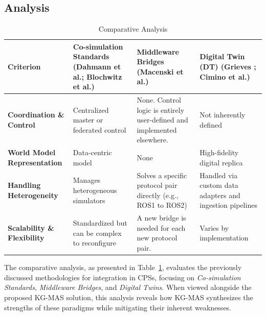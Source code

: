 \documentclass{article} %
\begin{document}
\subsection{Analysis}
\begin{table}[H]
\centering
\caption{Comparative Analysis}
\label{tab:comparison_cosim_middleware_dt}
\small
\begin{tabularx}{\textwidth}{@{} l >{\RaggedRight}X >{\RaggedRight}X >{\RaggedRight}X @{}}
\toprule
\textbf{Criterion} & 
\textbf{Co-simulation Standards \newline (Dahmann et al.\cite{dahmann1997department}; Blochwitz et al.\cite{blochwitz2011functional})} & 
\textbf{Middleware Bridges \newline (Macenski et al.\cite{macenski2020ros1bridge})} & 
\textbf{Digital Twin (DT) \newline (Grieves \cite{grieves2014digital}; Cimino et al.\cite{cimino2019digital})} \\
\midrule

\textbf{Coordination \& Control} & 
Centralized master or federated control & 
None. Control logic is entirely user-defined and implemented elsewhere. & 
Not inherently defined \\
\addlinespace

\textbf{World Model Representation} & 
Data-centric model & 
None & 
High-fidelity digital replica \\
\addlinespace

\textbf{Handling Heterogeneity} & 
Manages heterogeneous simulators & 
Solves a specific protocol pair directly (e.g., ROS1 to ROS2) & 
Handled via custom data adapters and ingestion pipelines \\
\addlinespace

\textbf{Scalability \& Flexibility} &
Standardized but can be complex to reconfigure & 
A new bridge is needed for each new protocol pair. & 
Varies by implementation \\
\bottomrule
\end{tabularx}
\end{table}


The comparative analysis, as presented in Table~\ref{tab:comparison_cosim_middleware_dt}, evaluates the previously discussed methodologies for integration in CPSs, focusing on \textit{Co-simulation Standards}, \textit{Middleware Bridges}, and \textit{Digital Twins}. When viewed alongside the proposed KG-MAS solution, this analysis reveals how KG-MAS synthesizes the strengths of these paradigms while mitigating their inherent weaknesses.
\end{document}
